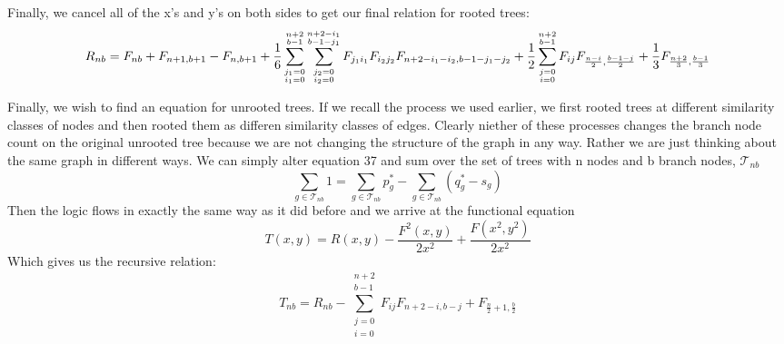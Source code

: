 \documentclass{article}
\begin{document}
Finally, we cancel all of the x's and y's on both sides to get our final relation for rooted trees:
\begin{equation}
\small
 R_{nb}=  F_{nb}+ F_{n+1,b+1} - F_{n,b+1} 
+\frac{1}{6}\sum_{\substack{j_1=0\\i_1=0}}^{\substack{n+2\\ b-1}}\sum_{\substack{j_2=0\\i_2=0}}^{\substack{n+2-i_1\\ b-1-j_1}}F_{j_1i_1}F_{i_2j_2}F_{n+2-i_1-i_2,b-1-j_1-j_2} 
+\frac{1}{2}\sum_{\substack{j=0\\i=0}}^{\substack{n+2\\ b-1}} F_{ij}F_{\frac{n-i}{2},\frac{b-1-j}{2}}+
\frac{1}{3} F_{\frac{n+2}{3},\frac{b-1}{3}} 
\end{equation}

Finally, we wish to find an equation for unrooted trees. If we recall the process we used earlier, we first rooted trees at different similarity classes of nodes and then rooted them as differen similarity classes of edges. Clearly niether of these processes changes the branch node count on the original unrooted tree because we are not changing the structure of the graph in any way. Rather we are just thinking about the same graph in different ways. We can simply alter equation 37 and sum over the set of trees with n nodes and b branch nodes, \(\mathscr{T}_{nb}\)
\begin{equation}
\sum_{g \in \mathscr{T}_{nb}} 1=\sum_{g \in \mathscr{T}_{nb}}p_g^*- \sum_{g \in \mathscr{T}_{nb}}(q_g^*-s_g)
\end{equation}
Then the logic flows in exactly the same way as it did before and we arrive at the functional equation
\begin{equation}
T(x,y)=R(x,y) -\frac{F^2(x,y)}{2x^2}+\frac{F(x^2,y^2)}{2x^2}
\end{equation}
Which gives us the recursive relation:
\begin{equation}
T_{nb}=R_{nb}-\sum_{\substack{j=0\\i=0}}^{\substack{n+2\\ b-1}}F_{ij}F_{n+2-i,b-j} + F_{\frac{n}{2}+1,\frac{b}{2}}
\end{equation}
\end{document}
